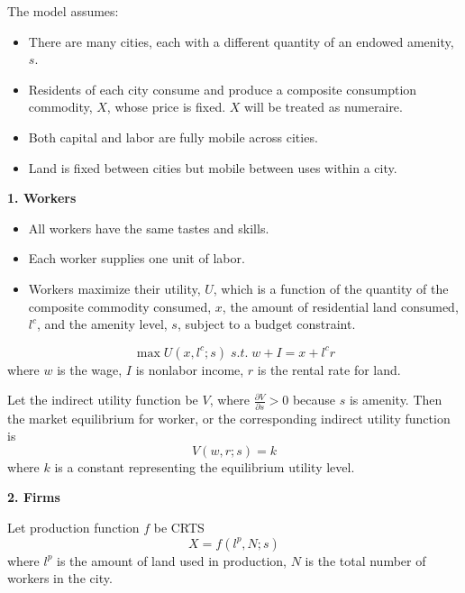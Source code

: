 \documentclass{article}
\numberwithin{equation}{section} %
\begin{document}

The model assumes:

\begin{itemize}
  \item There are many cities, each with a different quantity of an endowed amenity, $s$.
  \item Residents of each city consume and produce a composite consumption commodity, $X$, whose price is fixed. $X$ will be treated as numeraire.
  \item Both capital and labor are fully mobile across cities.
  \item Land is fixed between cities but mobile between uses within a city.
\end{itemize}

\textbf{1. Workers}
\begin{itemize}
  \item All workers have the same tastes and skills.
  \item Each worker supplies one unit of labor.
  \item Workers maximize their utility, $U$, which is a function of the quantity of the composite commodity consumed, $x$, the amount of residential land consumed, $l^c$, and the amenity level, $s$, subject to a budget constraint.
\end{itemize}

\begin{equation}
  \max U(x,l^c;s)\; s.t.\; w+I=x+l^c r \label{roback ump}
\end{equation}
where $w$ is the wage, $I$ is nonlabor income, $r$ is the rental rate for land.

Let the indirect utility function be $V$, where $\frac{\partial V}{\partial s}>0$ because $s$ is amenity. Then the market equilibrium for worker, or the corresponding indirect utility function is 
\begin{equation}
  V(w,r;s)=k \label{roback indirect}
\end{equation}
where $k$ is a constant representing the equilibrium utility level.

\textbf{2. Firms}

Let production function $f$ be CRTS
\begin{equation}
  X=f(l^p,N;s) \label{roback production function}
\end{equation}
where $l^p$ is the amount of land used in production, $N$ is the total number of workers in the city.
\end{document}
